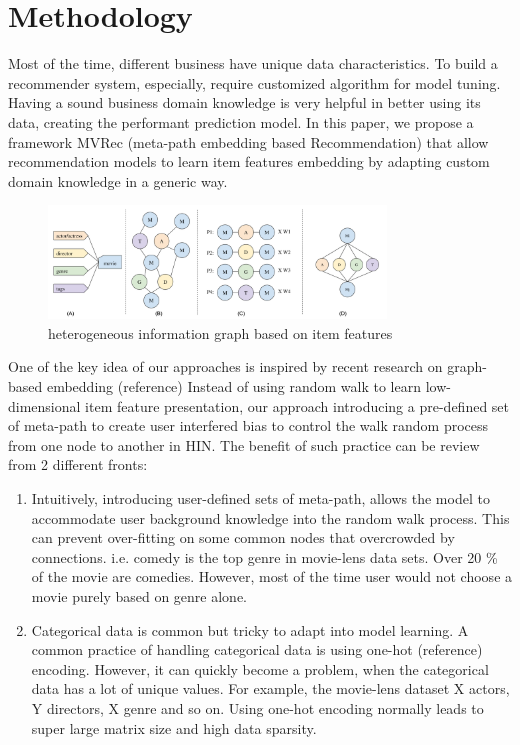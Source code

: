 \section{Methodology}
Most of the time, different business have unique data characteristics. To build a recommender system, especially, require customized algorithm for model tuning.  Having a sound business domain knowledge is very helpful in better using its data, creating the performant prediction model. In this paper, we propose a framework MVRec (meta-path embedding based Recommendation) that allow recommendation models to learn item features embedding by adapting custom domain knowledge in a generic way. 

\begin{figure}[!t]
    \centering
    \includegraphics[width=0.8\textwidth]{figs/fig1.png}
    \caption{heterogeneous information graph based on item features}\label{fig:fe-graph}
\end{figure}

One of the key idea of our approaches is inspired by recent research on graph-based embedding (reference) Instead of using random walk to learn low-dimensional item feature presentation, our approach introducing a pre-defined set of meta-path to create user interfered bias to control the walk random process from one node to another in HIN. The benefit of such practice can be review from 2 different fronts: 

\begin{enumerate}
    \item Intuitively, introducing user-defined sets of meta-path, allows the model to accommodate user background knowledge into the random walk process. This can prevent over-fitting on some common nodes that overcrowded by connections. i.e. comedy is the top genre in movie-lens data sets. Over 20 \% of the movie are comedies. However, most of the time user would not choose a movie purely based on genre alone.
    \item Categorical data is common but tricky to adapt into model learning. A common practice of handling categorical data is using one-hot (reference) encoding. However, it can quickly become a problem, when the categorical data has a lot of unique values. For example, the movie-lens dataset X actors, Y directors, X genre and so on. Using one-hot encoding normally leads to super large matrix size and high data sparsity.
\end{enumerate}

